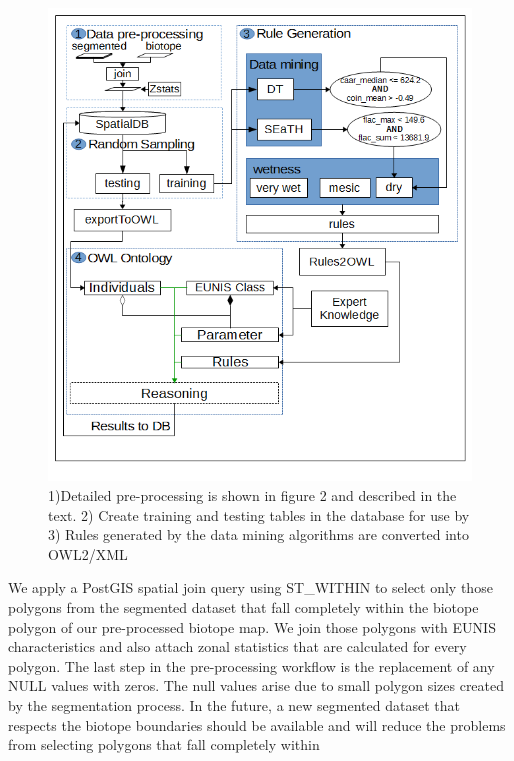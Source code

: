 \documentclass[authoryear, review,12pt,number]{elsarticle}
\begin{document}
\begin{figure}
	\includegraphics[width=1\linewidth]{diagrams/another_workflow_diagram_large.png}
	\caption{1)Detailed pre-processing is shown in figure 2 and described in the
	text.
	2) Create training and testing tables in the database for use by 3) 
Rules generated by the data mining algorithms are converted into OWL2/XML }
\end{figure}
We apply a PostGIS spatial join query using ST\_WITHIN to select only those
polygons from the segmented dataset that fall completely within the biotope
polygon of our pre-processed biotope map. We join those polygons
with EUNIS characteristics and also attach zonal statistics that are calculated
for every polygon. The last step in the pre-processing workflow is the
replacement of any NULL values with zeros. 
The null values arise due to small polygon sizes created by the segmentation
process. In the future, a new segmented dataset that respects the biotope
boundaries should be available and will reduce the problems from selecting
polygons that fall completely within
\end{document}

